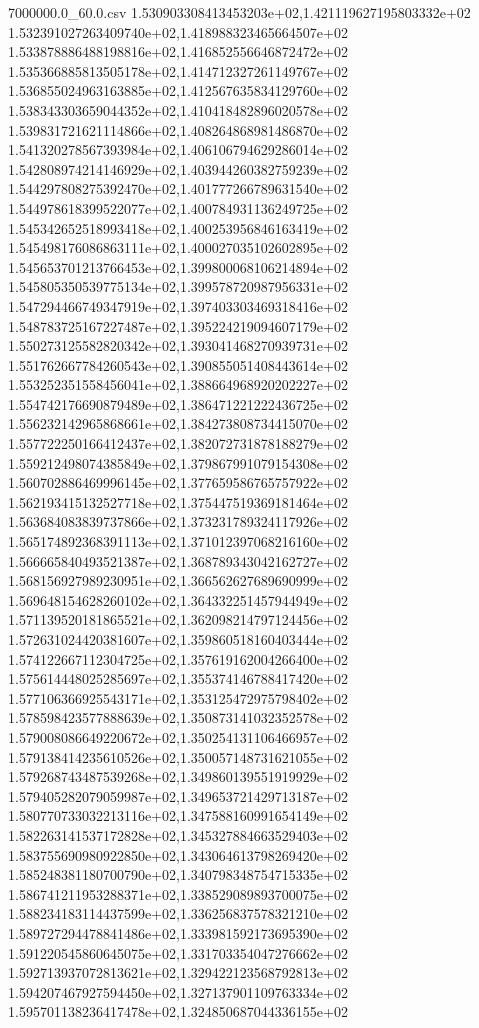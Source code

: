 \begin{filecontents*}{7000000.0_60.0.csv}
1.530903308413453203e+02,1.421119627195803332e+02
1.532391027263409740e+02,1.418988323465664507e+02
1.533878886488198816e+02,1.416852556646872472e+02
1.535366885813505178e+02,1.414712327261149767e+02
1.536855024963163885e+02,1.412567635834129760e+02
1.538343303659044352e+02,1.410418482896020578e+02
1.539831721621114866e+02,1.408264868981486870e+02
1.541320278567393984e+02,1.406106794629286014e+02
1.542808974214146929e+02,1.403944260382759239e+02
1.544297808275392470e+02,1.401777266789631540e+02
1.544978618399522077e+02,1.400784931136249725e+02
1.545342652518993418e+02,1.400253956846163419e+02
1.545498176086863111e+02,1.400027035102602895e+02
1.545653701213766453e+02,1.399800068106214894e+02
1.545805350539775134e+02,1.399578720987956331e+02
1.547294466749347919e+02,1.397403303469318416e+02
1.548783725167227487e+02,1.395224219094607179e+02
1.550273125582820342e+02,1.393041468270939731e+02
1.551762667784260543e+02,1.390855051408443614e+02
1.553252351558456041e+02,1.388664968920202227e+02
1.554742176690879489e+02,1.386471221222436725e+02
1.556232142965868661e+02,1.384273808734415070e+02
1.557722250166412437e+02,1.382072731878188279e+02
1.559212498074385849e+02,1.379867991079154308e+02
1.560702886469996145e+02,1.377659586765757922e+02
1.562193415132527718e+02,1.375447519369181464e+02
1.563684083839737866e+02,1.373231789324117926e+02
1.565174892368391113e+02,1.371012397068216160e+02
1.566665840493521387e+02,1.368789343042162727e+02
1.568156927989230951e+02,1.366562627689690999e+02
1.569648154628260102e+02,1.364332251457944949e+02
1.571139520181865521e+02,1.362098214797124456e+02
1.572631024420381607e+02,1.359860518160403444e+02
1.574122667112304725e+02,1.357619162004266400e+02
1.575614448025285697e+02,1.355374146788417420e+02
1.577106366925543171e+02,1.353125472975798402e+02
1.578598423577888639e+02,1.350873141032352578e+02
1.579008086649220672e+02,1.350254131106466957e+02
1.579138414235610526e+02,1.350057148731621055e+02
1.579268743487539268e+02,1.349860139551919929e+02
1.579405282079059987e+02,1.349653721429713187e+02
1.580770733032213116e+02,1.347588160991654149e+02
1.582263141537172828e+02,1.345327884663529403e+02
1.583755690980922850e+02,1.343064613798269420e+02
1.585248381180700790e+02,1.340798348754715335e+02
1.586741211953288371e+02,1.338529089893700075e+02
1.588234183114437599e+02,1.336256837578321210e+02
1.589727294478841486e+02,1.333981592173695390e+02
1.591220545860645075e+02,1.331703354047276662e+02
1.592713937072813621e+02,1.329422123568792813e+02
1.594207467927594450e+02,1.327137901109763334e+02
1.595701138236417478e+02,1.324850687044336155e+02

\end{filecontents*}
